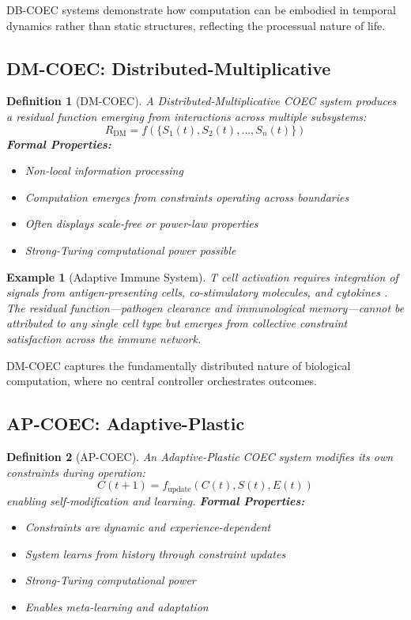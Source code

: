 \documentclass[11pt]{article}
\newtheorem{definition}{Definition}
\newtheorem{example}{Example}
\begin{document}
DB-COEC systems demonstrate how computation can be embodied in temporal dynamics rather than static structures, reflecting the processual nature of life.

\subsection{DM-COEC: Distributed-Multiplicative}

\begin{definition}[DM-COEC]
A Distributed-Multiplicative COEC system produces a residual function emerging from interactions across multiple subsystems:
\begin{equation}
R_{\text{DM}} = f(\{S_1(t), S_2(t), \ldots, S_n(t)\})
\end{equation}
\textbf{Formal Properties:}
\begin{itemize}
\item Non-local information processing
\item Computation emerges from constraints operating across boundaries
\item Often displays scale-free or power-law properties
\item Strong-Turing computational power possible
\end{itemize}
\end{definition}

\begin{example}[Adaptive Immune System]
T cell activation requires integration of signals from antigen-presenting cells, co-stimulatory molecules, and cytokines \citep{germain2004systems}. The residual function—pathogen clearance and immunological memory—cannot be attributed to any single cell type but emerges from collective constraint satisfaction across the immune network.
\end{example}

DM-COEC captures the fundamentally distributed nature of biological computation, where no central controller orchestrates outcomes.

\subsection{AP-COEC: Adaptive-Plastic}

\begin{definition}[AP-COEC]
An Adaptive-Plastic COEC system modifies its own constraints during operation:
\begin{equation}
C(t+1) = f_{\text{update}}(C(t), S(t), E(t))
\end{equation}
enabling self-modification and learning.
\textbf{Formal Properties:}
\begin{itemize}
\item Constraints are dynamic and experience-dependent
\item System learns from history through constraint updates
\item Strong-Turing computational power
\item Enables meta-learning and adaptation
\end{itemize}
\end{definition}
\end{document}
